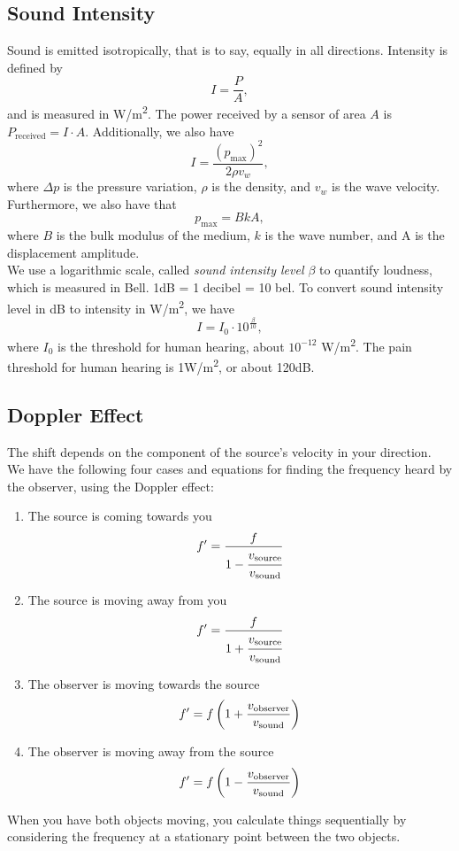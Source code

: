 \documentclass[class=article, crop=false]{standalone}
\begin{document}
  \subsection{Sound Intensity}
  Sound is emitted isotropically, that is to say, equally in all directions. Intensity is defined by 
  \[
    I = \frac{P}{A},
  \]
  and is measured in W/m\textsuperscript{2}. The power received by a sensor of area $A$ is $P_{\text{received}} = I\cdot A$. Additionally, we also have
  \[
    I = \frac{(p_{\text{max}})^2}{2\rho v_w},
  \]
  where $\Delta p$ is the pressure variation, $\rho$ is the density, and $v_w$ is the wave velocity. \\[10pt]
  Furthermore, we also have that
  \[
    p_{\text{max}} = BkA,
  \]
  where $B$ is the bulk modulus of the medium, $k$ is the wave number, and A is the displacement amplitude.\\[10pt]
  We use a logarithmic scale, called \emph{sound intensity level $\beta$} to quantify loudness, which is measured in Bell. 1dB = 1 decibel = 10 bel. To convert sound intensity level in dB to intensity in W/m\textsuperscript{2}, we have
  \[
    I = I_0\cdot 10^{\frac{\beta}{10}},
  \]
  where $I_0$ is the threshold for human hearing, about $10^{-12}$ W/m\textsuperscript{2}. The pain threshold for human hearing is 1W/m\textsuperscript{2}, or about 120dB.
  \subsection{Doppler Effect}
  The shift depends on the component of the source's velocity in your direction. \\[10pt]
  We have the following four cases and equations for finding the frequency heard by the observer, using the Doppler effect:
  \begin{enumerate}[label=(\alph*)]
    \item The source is coming towards you
    \[
      f'=\frac{f}{1-\cfrac{v_{\text{source}}}{v_{\text{sound}}}}
    \]
    \item The source is moving away from you
    \[
      f' = \frac{f}{1+\cfrac{v_{\text{source}}}{v_{\text{sound}}}}
    \]
    \item The observer is moving towards the source
    \[
      f' = f \left( 1+\frac{v_{\text{observer}}}{v_{\text{sound}}} \right)
    \]
    \item The observer is moving away from the source
    \[
      f' = f \left( 1 - \frac{v_{\text{observer}}}{v_{\text{sound}}} \right)
    \]
  \end{enumerate}
  When you have both objects moving, you calculate things sequentially by considering the frequency at a stationary point between the two objects.
\end{document}
